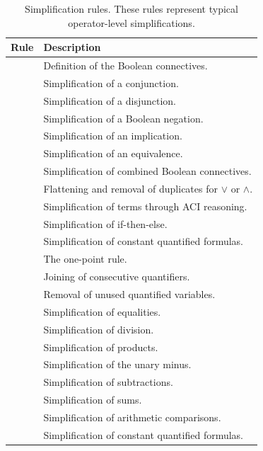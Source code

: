 \begin{xltabular}{\linewidth}{l X}
\caption{Simplification rules. These rules represent typical operator-level
simplifications.}
\label{rule-tab:simplification}\\
  Rule & Description \\
  \hline
{} & Definition of the Boolean connectives. \\
 & Simplification of a conjunction. \\
 & Simplification of a disjunction. \\
 & Simplification of a Boolean negation. \\
 & Simplification of an implication. \\
 & Simplification of an equivalence. \\
 & Simplification of combined Boolean connectives. \\
 & Flattening and removal of duplicates for $\lor$ or $\land$. \\
 & Simplification of terms through ACI reasoning. \\
 & Simplification of if-then-else. \\
 & Simplification of constant quantified formulas. \\
 & The one-point rule. \\
 & Joining of consecutive quantifiers. \\
 & Removal of unused quantified variables. \\
 & Simplification of equalities. \\
 & Simplification of division. \\
 & Simplification of products. \\
 & Simplification of the unary minus. \\
 & Simplification of subtractions. \\
 & Simplification of sums. \\
 & Simplification of arithmetic comparisons. \\
 & Simplification of constant quantified formulas. \\
\end{xltabular}

